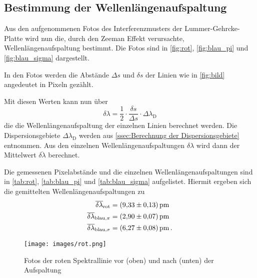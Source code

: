\subsection{Bestimmung der Wellenlängenaufspaltung}
\label{ssec:Bestimmung der Wellenlängenaufspaltung}

Aus den aufgenommenen Fotos des Interferenzmusters der Lummer-Gehrcke-Platte wird nun die, durch den Zeeman Effekt verursachte, Wellenlängenaufspaltung bestimmt.
Die Fotos sind in \autoref{fig:rot}, \autoref{fig:blau_pi} und \autoref{fig:blau_sigma} dargestellt.

In den Fotos werden die Abstände $\Delta s$ und $\delta s$ der Linien wie in \autoref{fig:bild} angedeutet in Pixeln gezählt.

Mit diesen Werten kann nun über 
\begin{equation}
    \delta \lambda = \frac{1}{2}\cdot\frac{\delta s}{\Delta s}\cdot\Delta \lambda_\text{D}
    \label{eq:delta_lambda}
\end{equation}
die die Wellenlängenaufspaltung der einzelnen Linien berechnet werden.
Die Dispersionsgebiete $\Delta\lambda_\text{D}$ werden aus \autoref{ssec:Berechnung der Dispersionsgebiete} entnommen.
Aus den einzelnen Wellenlängenaufspaltungen $\delta \lambda$ wird dann der Mittelwert $\overline{\delta\lambda}$ berechnet.

Die gemessenen Pixelabstände und die einzelnen Wellenlängenaufspaltungen sind in \autoref{tab:rot}, \autoref{tab:blau_pi} und \autoref{tab:blau_sigma} aufgelistet.
Hiermit ergeben sich die gemittelten Wellenlängenaufspaltungen zu 
\begin{align*}
    \overline{\delta \lambda}_\text{rot} &= \SI{9.33+-0.13}{\pico\meter} \\
    \overline{\delta \lambda}_{\text{blau,}\pi} &= \SI{2.90+-0.07}{\pico\meter} \\
    \overline{\delta \lambda}_{\text{blau,}\sigma} &= \SI{6.27+-0.08}{\pico\meter} \, .
\end{align*}

\newpage

\begin{figure}[ht]
    \centering
    \texttt{[image: images/rot.png]}
    \caption{Fotos der roten Spektrallinie vor (oben) und nach (unten) der Aufspaltung}
    \label{fig:rot}
\end{figure}

